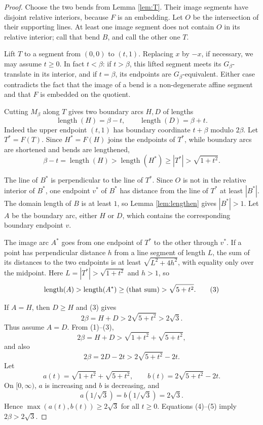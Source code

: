 \documentclass[12pt]{article}
\newcommand{\ellg}{\operatorname{length}}
\begin{document}
\begin{proof}
Choose the two bends from Lemma \ref{lem:T}.  Their image segments have
disjoint relative interiors, because \(F\) is an embedding.  Let \(O\) be
the intersection of their supporting lines.  At least one image segment
does not contain \(O\) in its relative interior; call that bend \(B\), and
call the other one \(T\).

Lift \(T\) to a segment from \((0,0)\) to \((t,1)\).  Replacing \(x\) by
\(-x\), if necessary, we may assume \(t\ge0\).  In fact \(t<\beta\): if
\(t>\beta\), this lifted segment meets its \(G_\beta\)-translate in its
interior, and if \(t=\beta\), its endpoints are \(G_\beta\)-equivalent.
Either case contradicts the fact that the image of a bend is a
non-degenerate affine segment and that \(F\) is embedded on the quotient.

Cutting \(M_\beta\) along \(T\) gives two boundary arcs \(H,D\) of lengths
\[
        \ellg(H)=\beta-t,\qquad \ellg(D)=\beta+t.        \tag{1}
\]
Indeed the upper endpoint \((t,1)\) has boundary coordinate \(t+\beta\)
modulo \(2\beta\).  Let \(T^*=F(T)\).  Since \(H^*=F(H)\) joins the
endpoints of \(T^*\), while boundary arcs are shortened and bends are
lengthened,
\[
        \beta-t=\ellg(H)>\ellg(H^*)\ge |T^*|>\sqrt{1+t^2}.       \tag{2}
\]

The line of \(B^*\) is perpendicular to the line of \(T^*\).  Since \(O\)
is not in the relative interior of \(B^*\), one endpoint \(v^*\) of
\(B^*\) has distance from the line of \(T^*\) at least \(|B^*|\).  The
domain length of \(B\) is at least \(1\), so Lemma \ref{lem:lengthen}
gives \(|B^*|>1\).  Let \(A\) be the boundary arc, either \(H\) or \(D\),
which contains the corresponding boundary endpoint \(v\).

The image arc \(A^*\) goes from one endpoint of \(T^*\) to the other
through \(v^*\).  If a point has perpendicular distance \(h\) from a line
segment of length \(L\), the sum of its distances to the two endpoints is
at least \(\sqrt{L^2+4h^2}\), with equality only over the midpoint.  Here
\(L=|T^*|>\sqrt{1+t^2}\) and \(h>1\), so
\[
        \ellg(A)>\ellg(A^*)\ge
        \hbox{(that sum)}>\sqrt{5+t^2}.                  \tag{3}
\]

If \(A=H\), then \(D\ge H\) and (3) gives
\[
        2\beta=H+D>2\sqrt{5+t^2}>2\sqrt3.
\]
Thus assume \(A=D\).  From (1)--(3),
\[
 2\beta=H+D>\sqrt{1+t^2}+\sqrt{5+t^2},                         \tag{4}
\]
and also
\[
 2\beta=2D-2t>2\sqrt{5+t^2}-2t.                                \tag{5}
\]
Let
\[
 a(t)=\sqrt{1+t^2}+\sqrt{5+t^2},\qquad
 b(t)=2\sqrt{5+t^2}-2t .
\]
On \([0,\infty)\), \(a\) is increasing and \(b\) is decreasing, and
\[
        a(1/\sqrt3)=b(1/\sqrt3)=2\sqrt3 .
\]
Hence \(\max(a(t),b(t))\ge2\sqrt3\) for all \(t\ge0\).  Equations
(4)--(5) imply \(2\beta>2\sqrt3\).
\end{proof}
\end{document}
